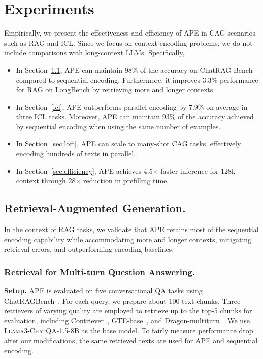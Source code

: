 \section{Experiments}

Empirically, we present the effectiveness and efficiency of APE in CAG scenarios such as RAG and ICL. Since we focus on context encoding problems, we do not include comparisons with long-context LLMs. Specifically,
\begin{itemize}[itemsep=0.0ex,topsep=0pt,leftmargin=*]
	\item In Section~\ref{sec:longbench}, APE can maintain 98\% of the accuracy on ChatRAG-Bench compared to sequential encoding. Furthermore, it improves 3.3\% performance for RAG on LongBench by retrieving more and longer contexts. 
	\item In Section~\ref{icl}, APE outperforms parallel encoding by 7.9\% on average in three ICL tasks. Moreover, APE can maintain 93\% of the accuracy achieved by sequential encoding when using the same number of examples.
        \item In Section~\ref{sec:loft}, APE can scale to many-shot CAG tasks, effectively encoding hundreds of texts in parallel.
	\item In Section~\ref{sec:efficiency}, APE achieves 4.5$\times$ faster inference for 128k context through 28$\times$ reduction in prefilling time.
\end{itemize}

\subsection{Retrieval-Augmented Generation.}
\label{sec:longbench}

In the context of RAG tasks, we validate that APE retains most of the sequential encoding capability while accommodating more and longer contexts, mitigating retrieval errors, and outperforming encoding baselines.


\subsubsection{Retrieval for Multi-turn Question Answering.}

\textbf{Setup.} APE is evaluated on five conversational QA tasks using ChatRAGBench~\citep{liu2024chatqa}. For each query, we prepare about 100 text chunks. Three retrievers of varying quality are employed to retrieve up to the top-5 chunks for evaluation, including Contriever~\citep{izacard2021unsupervised}, GTE-base~\cite{li2023towards}, and Dragon-multiturn~\cite{liu2024chatqa}. We use \textsc{Llama3-ChatQA-1.5-8B} as the base model. To fairly measure performance drop after our modifications, the same retrieved texts are used for APE and sequential encoding.

